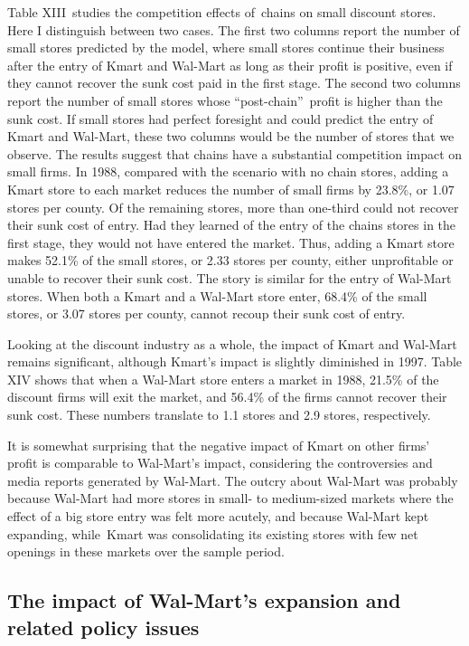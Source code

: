 \documentclass[notitlepage,onecolumn,11pt]{article}
\begin{document}
Table XIII\ studies the competition effects of\ chains on small discount
stores. Here I distinguish between two cases. The first two columns report
the number of small stores predicted by the model, where small stores
continue their business after the entry of Kmart and Wal-Mart as long as
their profit is positive, even if they cannot recover the sunk cost paid in
the first stage. The second two columns report the number of small stores
whose \textquotedblleft post-chain\textquotedblright\ profit is higher than
the sunk cost. If small stores had perfect foresight and could predict the
entry of Kmart and Wal-Mart, these two columns would be the number of stores
that we observe. The results suggest that chains have a substantial
competition impact on small firms. In 1988, compared with the scenario with
no chain stores, adding a Kmart store to each market reduces the number of
small firms by 23.8\%, or 1.07 stores per county. Of the remaining stores,
more than one-third could not recover their sunk cost of entry. Had they
learned of the entry of the chains stores in the first stage, they would not
have entered the market. Thus, adding a Kmart store makes 52.1\% of the
small stores, or 2.33 stores per county, either unprofitable or unable to
recover their sunk cost. The story is similar for the entry of Wal-Mart
stores. When both a Kmart and a Wal-Mart store enter, 68.4\% of the small
stores, or 3.07 stores per county, cannot recoup their sunk cost of entry.

Looking at the discount industry as a whole, the impact of Kmart and
Wal-Mart remains significant, although Kmart's impact is slightly diminished
in 1997. Table XIV shows that when a Wal-Mart store enters a market in 1988,
21.5\% of the discount firms will exit the market, and 56.4\% of the firms
cannot recover their sunk cost. These numbers translate to 1.1 stores and
2.9 stores, respectively.

It is somewhat surprising that the negative impact of Kmart on other firms'
profit is comparable to Wal-Mart's impact, considering the controversies and
media reports generated by Wal-Mart. The outcry about Wal-Mart was probably
because Wal-Mart had more stores in small- to medium-sized markets where the
effect of a big store entry was felt more acutely, and because Wal-Mart kept
expanding, while\ Kmart was consolidating its existing stores with few net
openings in these markets over the sample period.

\subsection{The impact of Wal-Mart's expansion and related policy issues 
\label{Wal-Mart}}
\end{document}
